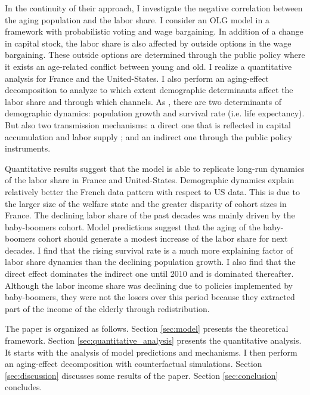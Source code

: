 In the continuity of their approach, I investigate the negative correlation between the aging population and the labor share. I consider an OLG model in a framework with probabilistic voting and wage bargaining. In addition of a change in capital stock, the labor share is also affected by outside options in the wage bargaining. These outside options are determined through the public policy where it exists an age-related conflict between young and old. I realize a quantitative analysis for France and the United-States. I also perform an aging-effect decomposition to analyze to which extent demographic determinants affect the labor share and through which channels. As \cite{Gonzalez-Eiras2012}, there are two determinants of demographic dynamics: population growth and survival rate (i.e. life expectancy). But also two transmission mechanisms: a direct one that is reflected in capital accumulation and labor supply ; and an indirect one through the public policy instruments.

Quantitative results suggest that the model is able to replicate long-run dynamics of the labor share in France and United-States. Demographic dynamics explain relatively better the French data pattern with respect to US data. This is due to the larger size of the welfare state and the greater disparity of cohort sizes in France. 
The declining labor share of the past decades was mainly driven by the baby-boomers cohort. Model predictions suggest that the aging of the baby-boomers cohort should generate a modest increase of the labor share for next decades.
I find that the rising survival rate is a much more explaining factor of labor share dynamics than the declining population growth. I also find that the direct effect dominates the indirect one until 2010 and is dominated thereafter.
Although the labor income share was declining due to policies implemented by baby-boomers, they were not the losers over this period because they extracted part of the income of the elderly through redistribution.


The paper is organized as follows. Section \ref{sec:model} presents the theoretical framework. Section \ref{sec:quantitative_analysis} presents the quantitative analysis. It starts with the analysis of model predictions and mechanisms. I then perform an aging-effect decomposition with counterfactual simulations. Section \ref{sec:discussion} discusses some results of the paper. Section \ref{sec:conclusion} concludes.

